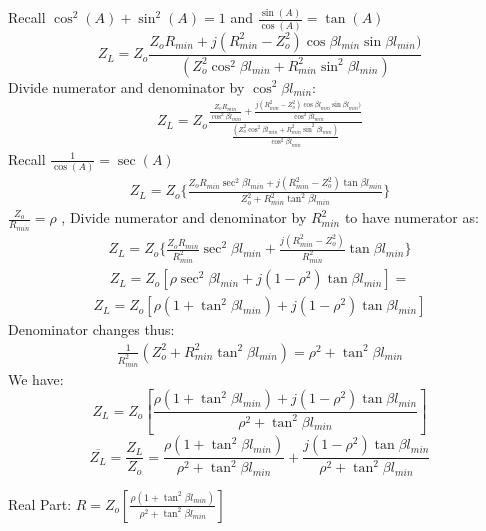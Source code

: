 Recall $ \cos^{2}(A) + \sin^{2}(A) = 1 $ and $ \frac{\sin(A)}{\cos(A)} = \tan(A) $
\begin{dmath}
Z_{L} = Z_o\frac{Z_oR_{min} + j(R_{min}^{2}-Z_o^{2})\cos\beta l_{min}\sin\beta l_{min})}{(Z_o^{2}\cos^{2}\beta l_{min} + R_{min}^{2}\sin^{2}\beta l_{min})}
\end{dmath}
Divide numerator and denominator by $\cos^{2}\beta l_{min}$:
\begin{align*}
Z_{L} = Z_o\frac{\frac{Z_oR_{min}}{\cos^{2}\beta l_{min}} + \frac{j(R_{min}^{2}-Z_o^{2})\cos\beta l_{min}\sin\beta l_{min})}{\cos^{2}\beta l_{min}}}{\frac{(Z_o^{2}\cos^{2}\beta l_{min} + R_{min}^{2}\sin^{2}\beta l_{min})}{\cos^{2}\beta l_{min}}}
\end{align*}
Recall $ \frac{1}{\cos(A)} = \sec(A) $
\begin{align}
Z_{L} = Z_o\{\frac{Z_oR_{min}\sec^{2}\beta l_{min} + j(R_{min}^{2}-Z_o^{2})\tan\beta l_{min}}{Z_o^{2}+ R_{min}^{2}\tan^{2}\beta l_{min}}\}
\end{align}
$\frac{Z_o}{R_{min}} = \rho$ , Divide numerator and denominator by $R_{min}^{2}$ to have numerator as:
\begin{align*}
Z_{L} = Z_o\{\frac{Z_oR_{min}}{R_{min}^{2}}\sec^{2}\beta l_{min} + \frac{j(R_{min}^{2}-Z_o^{2})}{{R_{min}^{2}}}\tan\beta l_{min}\}
\end{align*}
\begin{align*}
Z_{L} = Z_o [\rho \sec^{2}\beta l_{min} + j(1-\rho^{2})\tan\beta l_{min}] =
\end{align*}
\begin{align*}
Z_{L} = Z_o [ \rho (1 + \tan^{2}\beta l_{min}) + j(1-\rho^{2})\tan\beta l_{min}]
\end{align*}
Denominator changes thus:
\begin{align*}
\frac{1}{R_{min}^{2}}{(Z_o^{2} + R_{min}^{2}\tan^{2}\beta l_{min})} = \rho^{2} + \tan^{2}\beta l_{min}
\end{align*}
We have:
{\footnotesize
\begin{dmath}
Z_{L} = Z_o \left[\frac{\rho (1 + \tan^{2}\beta l_{min}) + j(1-\rho^{2})\tan\beta l_{min}}{\rho^{2} + \tan^{2}\beta l_{min}} \right]
\end{dmath}}
\begin{dmath*}
\overline{Z_{L}} = \frac{Z_{L}}{Z_o} =  \frac{\rho (1 + \tan^{2}\beta l_{min})}{\rho^{2} + \tan^{2}\beta l_{min}} + \frac{j(1-\rho^{2})\tan\beta l_{min}}{\rho^{2} + \tan^{2}\beta l_{min}}
\end{dmath*}

Real Part: $R = Z_o[\frac{\rho (1 + \tan^{2}\beta l_{min})}{\rho^{2} + \tan^{2}\beta l_{min}}]$\\

